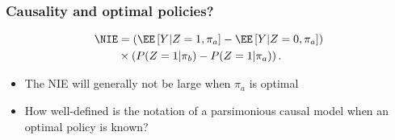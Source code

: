 \begin{frame}\frametitle{Causality and optimal policies?}
\begin{align*}
	\NIE & = \left( \EE\left[Y | Z=1, \pi_a \right] - \EE\left[Y | Z=0, \pi_a \right] \right)  \\  
	& \times  \left( P(Z=1| \pi_b) -P(Z=1| \pi_a) \right).%
\end{align*}
\begin{itemize}
\item The NIE will generally not be large when $\pi_a$ is optimal\pause
\item How well-defined is the notation of a parsimonious causal model when an optimal policy is known? 
\end{itemize}		
\vspace{3cm}
\end{frame}


